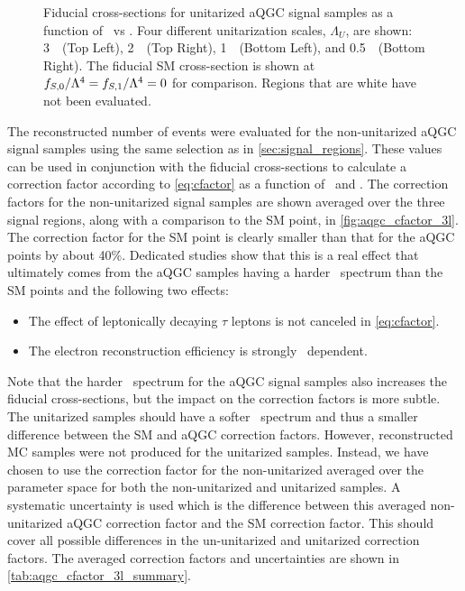 \begin{figure}[ht!]
\caption{Fiducial cross-sections for unitarized aQGC signal samples as a function of \fszero~vs \fsone.
Four different unitarization scales, $\Lambda_U$, are shown: 3~\TeV~(Top Left),
2~\TeV~(Top Right), 1~\TeV~(Bottom Left), and 0.5~\TeV~(Bottom Right).
The fiducial SM cross-section is shown at $f_{S,0}/\Lambda^4=f_{S,1}/\Lambda^4=0$ for comparison.
Regions that are white have not been evaluated.  }
\label{fig:aqgc_fiducial_xsec_3l_unit}
\end{figure}



The reconstructed number of events were evaluated for the non-unitarized
aQGC signal samples using the same selection as in \sec\ref{sec:signal_regions}.
These values can be used in conjunction with the fiducial cross-sections
to calculate a correction factor according to \eqn\eqref{eq:cfactor} as a function 
of \fszero~and \fsone. The correction factors for the non-unitarized signal samples
are shown averaged over the three signal regions, along with a comparison to the SM point,
in \fig\ref{fig:aqgc_cfactor_3l}.
The correction factor for the SM point is clearly smaller than that for the aQGC
points by about 40\%. Dedicated studies show that this is a real effect 
that ultimately comes from the aQGC samples having a harder \pt~spectrum
than the SM points and the following two effects:
\begin{itemize}
\item The effect of leptonically decaying $\tau$ leptons is not 
canceled in \eqn\eqref{eq:cfactor}.
\item The electron reconstruction efficiency is strongly \pt~dependent.
\end{itemize}
Note that the harder \pt~spectrum for the aQGC signal samples also 
increases the fiducial cross-sections, but the impact on the correction factors is more subtle.
The unitarized samples should have a softer \pt~spectrum and thus a
smaller difference between the SM and aQGC correction factors. However,
reconstructed MC samples were not produced for the unitarized samples.
Instead, we have chosen to use the 
correction factor for the non-unitarized averaged over the parameter space for 
both the non-unitarized and unitarized samples.  A systematic uncertainty  
is used which is the difference between this averaged non-unitarized
aQGC correction factor and the SM correction factor. This should cover all possible differences
in the un-unitarized and unitarized correction factors. 
The averaged correction factors
and uncertainties are shown in \tab\ref{tab:aqgc_cfactor_3l_summary}.

